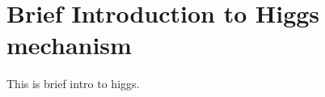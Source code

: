 \section{Brief Introduction to Higgs mechanism}
This is brief intro to higgs.
\begin{comment}
{\bf Higgs mechanism in context of abelian U(1) case:}\\
Higgs mechanism considers a gauge invariant\footnote{The concept of gauge invariance is fundamental in the construction of the Standard Model of strong, weak and electromagnetic interactions of elementary particles. The gauge principle prescribes that, given the gauge symmetry group and the transformations of the fields, the quantum field theory is uniquely defined \cite{book:CoughlanDodd}} lagrangian density $L$ corresponding to a complex scalar field $\phi$ coupled to itself and to an electromagnetic field $A_\mu$
	\begin{equation} \label{lag}
	L=-\frac{1}{4}F_{\mu \nu}F^{\mu \nu}+D_\mu \phi^{*} D^\mu \phi - V(\phi)
	\end{equation}
with $D_\mu$ the covariant derivative $D_\mu = \partial_\mu-ieA_\mu$ and with the scalar potential
	\begin{equation}
	V(\phi) = \mu^2 \phi^{*} \phi + \lambda (\phi^{*} \phi )^2
	\end{equation}
Here, the term $\lambda > 0$ ensures that the potential is bounded form below. Also, The Lagrangian is invariant under the local U(1) gauge transformation:
	\begin{eqnarray}
	\phi(x) & \rightarrow & e^{ie\alpha(x)}\phi(x), \nonumber \\
	A_\mu(x) & \rightarrow & A_\mu(x) - \frac{1}{e}\partial \alpha(x)
	\end{eqnarray}
For $\mu^2 > 0$, $L$  the minimum of potential is at $\phi = 0$. Therefore, vacuum expectatin value for the field $\Braket{0|\phi|0} = \phi_0 = 0$. Thus, the lagrangian of equation (\ref{lag}) then dscribes the physics of a massless vector boson interacting with a massive (with mass $\mu$) charged scalar particle. It is also invariant under the reflection symmetry $\phi \rightarrow -\phi$.\\
Now, for the case of 


\end{comment}
